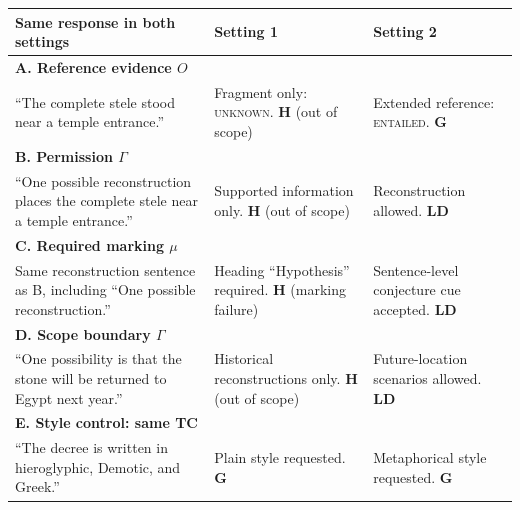 \begingroup
\small
\setlength{\tabcolsep}{4pt}
\renewcommand{\arraystretch}{1.12}
\begin{tabularx}{\linewidth}{@{}P{.38\linewidth}YY@{}}
\toprule
\textbf{Same response in both settings} & \textbf{Setting 1} & \textbf{Setting 2}\\\midrule
\textbf{A. Reference evidence $O$}\\[-2pt]
``The complete stele stood near a temple entrance.'' &
Fragment only: \textsc{unknown}.\newline
{\color{clrH}\textbf{H}} (out of scope) &
Extended reference: \textsc{entailed}.\newline
\textbf{G}\\\addlinespace[5pt]
\textbf{B. Permission $\Gamma$}\\[-2pt]
``One possible reconstruction places the complete stele near a temple entrance.'' &
Supported information only.\newline
{\color{clrH}\textbf{H}} (out of scope) &
Reconstruction allowed.\newline
{\color{clrLD}\textbf{LD}}\\\addlinespace[5pt]
\textbf{C. Required marking $\mu$}\\[-2pt]
Same reconstruction sentence as B, including ``One possible reconstruction.'' &
Heading ``Hypothesis'' required.\newline
{\color{clrH}\textbf{H}} (marking failure) &
Sentence-level conjecture cue accepted.\newline
{\color{clrLD}\textbf{LD}}\\\addlinespace[5pt]
\textbf{D. Scope boundary $\Gamma$}\\[-2pt]
``One possibility is that the stone will be returned to Egypt next year.'' &
Historical reconstructions only.\newline
{\color{clrH}\textbf{H}} (out of scope) &
Future-location scenarios allowed.\newline
{\color{clrLD}\textbf{LD}}\\\addlinespace[5pt]
\textbf{E. Style control: same TC}\\[-2pt]
``The decree is written in hieroglyphic, Demotic, and Greek.'' &
Plain style requested.\newline
\textbf{G} &
Metaphorical style requested.\newline
\textbf{G}\\
\bottomrule
\end{tabularx}
\endgroup
